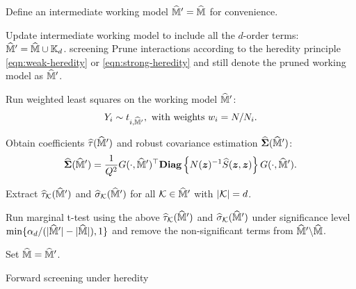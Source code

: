 \documentclass[12pt]{article}
\begin{document}
\begin{algorithm}[!ht]
\DontPrintSemicolon
{}                %


    
    Define an intermediate working model $\widehat{{\mathbb{M}}}' = \widehat{{\mathbb{M}}}$ for convenience.
    
    {
      Update intermediate working model to include all the $d$-order terms: $\widehat{{\mathbb{M}}}' = \widehat{{\mathbb{M}}} \cup {\mathbb{K}}_d$.\label{alg:step-add-d-way} 
         screening
      Prune interactions according to the heredity principle \eqref{eqn:weak-heredity} or \eqref{eqn:strong-heredity} and still denote the pruned working model as $\widehat{{\mathbb{M}}}'$.  \label{alg:step-prune}      
      
      Run weighted least squares on the working model $\widehat{{\mathbb{M}}}'$:
       \begin{align*}
          Y_i \sim t_{i, \widehat{{\mathbb{M}}}'}, \text{ with weights } w_i = N/N_i.
       \end{align*}
    
     
      Obtain coefficients $\widehat{\tau}(\widehat{{\mathbb{M}}}')$ and robust covariance estimation $\widehat{{\boldsymbol{\Sigma}}}(\widehat{{\mathbb{M}}}')$:
      \begin{align*}
          \widehat{{\boldsymbol{\Sigma}}}(\widehat{{\mathbb{M}}}') = \frac{1}{Q^2}G(\cdot,\widehat{{\mathbb{M}}}')^\top \text{\bfseries Diag}\left\{N({\boldsymbol{z}})^{-1}{\widehat{S}}({\boldsymbol{z}},{\boldsymbol{z}})\right\} G(\cdot,\widehat{{\mathbb{M}}}').
      \end{align*} \label{alg:BC-1}
      

       Extract $\widehat{\tau}_{{\mathcal{K}}}(\widehat{{\mathbb{M}}}')$ and $\widehat{\sigma}_{\mathcal{K}}(\widehat{{\mathbb{M}}}')$ for all ${\mathcal{K}}\in\widehat{{\mathbb{M}}}'$ with $|{\mathcal{K}}| = d$. \label{alg:BC-2}

      Run marginal t-test using the above $\widehat{\tau}_{{\mathcal{K}}}(\widehat{{\mathbb{M}}}')$ and $\widehat{\sigma}_{\mathcal{K}}(\widehat{{\mathbb{M}}}')$  under significance level $\min\{\alpha_d/(|\widehat{{\mathbb{M}}}'|-|\widehat{{\mathbb{M}}}|),1\}$ and remove the non-significant terms from $\widehat{{\mathbb{M}}}'\backslash\widehat{{\mathbb{M}}}$.  \label{alg:BC-3}

      Set $\widehat{{\mathbb{M}}} = \widehat{{\mathbb{M}}}'$.
         
    }
    
    
    \KwRet{$\hat{\bbM}$}
    
\caption{Forward  screening under heredity}
\label{alg:forward-ms}
\end{algorithm}
\end{document}
